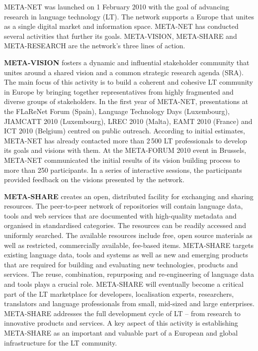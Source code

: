 META-NET was launched on 1 February 2010 with the goal of advancing
research in language technology (LT). The network supports a Europe that
unites as a single digital market and information space. META-NET has
conducted several activities that further its goals. META-VISION,
META-SHARE and META-RESEARCH are the network’s three lines of action.


{\bf META-VISION} fosters a dynamic and influential stakeholder community that
unites around a shared vision and a common strategic research agenda
(SRA). The main focus of this activity is to build a coherent and
cohesive LT community in Europe by bringing together representatives
from highly fragmented and diverse groups of stakeholders. In the first
year of META-NET, presentations at the FLaReNet Forum (Spain), Language
Technology Days (Luxembourg), JIAMCATT 2010 (Luxembourg), LREC 2010
(Malta), EAMT 2010 (France) and ICT 2010 (Belgium) centred on public
outreach. According to initial estimates, META-NET has already contacted
more than 2\,500 LT professionals to develop its goals and visions with
them. At the META-FORUM 2010 event in Brussels, META-NET communicated
the initial results of its vision building process to more than 250
participants. In a series of interactive sessions, the participants
provided feedback on the visions presented by the network. 

{\bf META-SHARE} creates an open, distributed facility for exchanging and
sharing resources. The peer-to-peer network of repositories will contain
language data, tools and web services that are documented with
high-quality metadata and organised in standardised categories. The
resources can be readily accessed and uniformly searched. The available
resources include free, open source materials as well as restricted,
commercially available, fee-based items. META-SHARE targets existing
language data, tools and systems as well as new and emerging products
that are required for building and evaluating new technologies, products
and services. The reuse, combination, repurposing and re-engineering of
language data and tools plays a crucial role. META-SHARE will eventually
become a critical part of the LT marketplace for developers,
localisation experts, researchers, translators and language
professionals from small, mid-sized and large enterprises. META-SHARE
addresses the full development cycle of LT -- from research to
innovative products and services. A key aspect of this activity is
establishing META-SHARE as an important and valuable part of a European
and global infrastructure for the LT community. 

